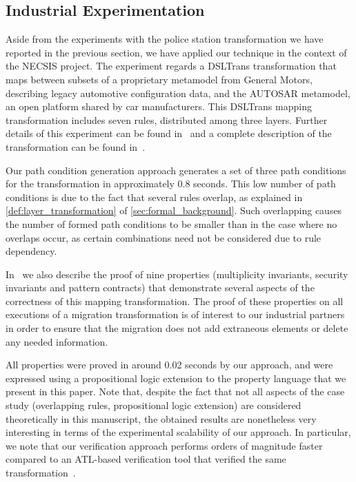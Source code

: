 \subsection{Industrial Experimentation}
\label{sec:industrial_exp}

Aside from the experiments with the police station transformation we have
reported in the previous section, we have applied our technique in the context
of the NECSIS project.
The experiment regards a DSLTrans transformation that maps between subsets of a
proprietary metamodel from General Motors, describing legacy automotive configuration data, and
the AUTOSAR metamodel, an open platform shared by car manufacturers. This DSLTrans mapping transformation includes seven rules, distributed among three
layers. Further details of this experiment can be found in~\cite{gehan:13} and a complete description of the transformation can be found in~\cite{SelimWCD12}.

Our path condition generation approach generates a set of three path conditions for the transformation in approximately 0.8 seconds. This low number of path conditions is
due to the fact that several rules overlap, as explained in \cref{def:layer_transformation} of \cref{sec:formal_background}. Such overlapping causes the number of formed path conditions to be smaller than in the case where no overlaps occur, as certain combinations need not be considered due to rule dependency.

In~\cite{conf/gg/SelimLCDO14} we also describe the proof of nine properties (multiplicity invariants, security invariants and pattern contracts) that demonstrate several aspects of the correctness of this mapping transformation. The proof of these properties on all executions of a migration transformation is of interest to our industrial partners in order to ensure that the migration does not add extraneous elements or delete any needed information.

All properties were proved in around 0.02 seconds by our approach, and were expressed using a propositional logic extension to the property language that we present in this paper. Note that, despite the fact that not all aspects of the case study (overlapping rules, propositional logic extension) are considered theoretically in this manuscript, the obtained results are nonetheless very interesting in terms of the experimental scalability of our approach. In particular, we note that our verification approach performs orders of magnitude faster compared to an ATL-based verification tool that verified the same transformation~\cite{conf/gg/SelimLCDO14}.

